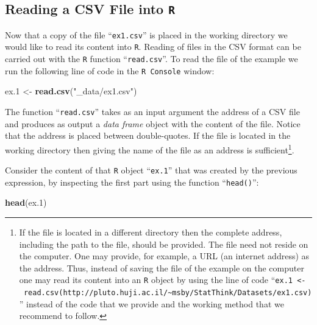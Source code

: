 \documentclass[]{krantz}
\makeatletter
\newenvironment{Shaded}{\begin{snugshade}}{\end{snugshade}}
\newcommand{\FloatTok}[1]{\textcolor[rgb]{0.00,0.00,0.81}{#1}}
\newcommand{\KeywordTok}[1]{\textcolor[rgb]{0.13,0.29,0.53}{\textbf{#1}}}
\newcommand{\NormalTok}[1]{#1}
\newcommand{\StringTok}[1]{\textcolor[rgb]{0.31,0.60,0.02}{#1}}
\newenvironment{kframe}{%
\medskip{}
\setlength{\fboxsep}{.8em}
 \def\at@end@of@kframe{}%
 \ifinner\ifhmode%
  \def\at@end@of@kframe{\end{minipage}}%
  \begin{minipage}{\columnwidth}%
 \fi\fi%
 \def\FrameCommand##1{\hskip\@totalleftmargin \hskip-\fboxsep
 \colorbox{shadecolor}{##1}\hskip-\fboxsep
     \hskip-\linewidth \hskip-\@totalleftmargin \hskip\columnwidth}%
 \MakeFramed {\advance\hsize-\width
   \@totalleftmargin\z@ \linewidth\hsize
   \@setminipage}}%
 {\par\unskip\endMakeFramed%
 \at@end@of@kframe}
\renewenvironment{Shaded}{\begin{kframe}}{\end{kframe}}
\theoremstyle{definition}
\theoremstyle{definition}
\theoremstyle{definition}
\theoremstyle{remark}
\makeatother
\begin{document}
\hypertarget{Data_3}{%
\subsection{\texorpdfstring{Reading a CSV File into \texttt{R}}{Reading a CSV File into R}}\label{Data_3}}

Now that a copy of the file ``\texttt{ex1.csv}'' is placed in the working
directory we would like to read its content into \texttt{R}. Reading of files
in the CSV format can be carried out with the \texttt{R} function ``\texttt{read.csv}''.
To read the file of the example we run the following line of code in the
\texttt{R\ Console} window:

\begin{Shaded}
\begin{Highlighting}[]
\NormalTok{ex}\FloatTok{.1}\NormalTok{ <-}\StringTok{ }\KeywordTok{read.csv}\NormalTok{(}\StringTok{"_data/ex1.csv"}\NormalTok{)}
\end{Highlighting}
\end{Shaded}

The function ``\texttt{read.csv}'' takes as an input argument the address of a
CSV file and produces as output a \emph{data frame} object with the content
of the file. Notice that the address is placed between double-quotes. If
the file is located in the working directory then giving the name of the
file as an address is sufficient\footnote{If the file is located in a different directory then the complete
  address, including the path to the file, should be provided. The
  file need not reside on the computer. One may provide, for example,
  a URL (an internet address) as the address. Thus, instead of saving
  the file of the example on the computer one may read its content
  into an \texttt{R} object by using the line of code
  ``\texttt{ex.1\ \textless{}-\ read.csv(http://pluto.huji.ac.il/\textasciitilde{}msby/StatThink/Datasets/ex1.csv)}''
  instead of the code that we provide and the working method that we
  recommend to follow.}.

Consider the content of that \texttt{R} object ``\texttt{ex.1}'' that was created by the
previous expression, by inspecting the first part using the function ``\texttt{head()}'':

\begin{Shaded}
\begin{Highlighting}[]
\KeywordTok{head}\NormalTok{(ex}\FloatTok{.1}\NormalTok{)}
\end{Highlighting}
\end{Shaded}
\end{document}
